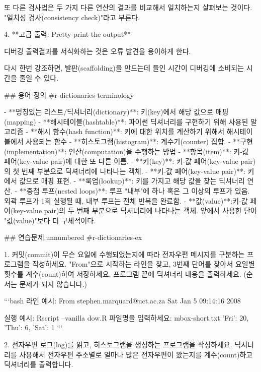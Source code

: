 \documentclass[
  letterpaper,
]{book}
\begin{document}
{    또 다른 검사법은 두 가지 다른 연산의 결과를 비교해서 일치하는지 살펴보는 것이다. "일치성 검사(consistency check)"라고 부른다.

4. **고급 출력: Pretty print the output**

   디버깅 출력결과를 서식화하는 것은 오류 발견을 용이하게 한다.

다시 한번 강조하면, 발판(scaffolding)을 만드는데 들인 시간이 디버깅에 소비되는 시간을 줄일 수 있다.

## 용어 정의 {#r-dictionaries-terminology}

- **명칭있는 리스트/딕셔너리(dictionary)**: 키(key)에서 해당 값으로 매핑(mapping)
- **해시테이블(hashtable)**: 파이썬 딕셔너리를 구현하기 위해 사용된 알고리즘
- **해시 함수(hash function)**: 키에 대한 위치를 계산하기 위해서 해시테이블에서 사용되는 함수
- **히스토그램(histogram)**: 계수기(counter) 집합.
- **구현(implementation)**: 연산(computation)을 수행하는 방법
- **항목(item)**: 키-값 페어(key-value pair)에 대한 또 다른 이름.
- **키(key)**: 키-값 페어(key-value pair)의 첫 번째 부분으로 딕셔너리에 나타나는 객체.
- **키-값 페어(key-value pair)**: 키에서 값으로 매핑 표현.
- **룩업(lookup)**: 키를 가지고 해당 값을 찾는 딕셔너리 연산.
- **중첩 루프(nested loops)**: 루프 "내부"에 하나 혹은 그 이상의 루프가 있음. 외곽 루프가 1회 실행될 때, 내부 루프는 전체 반복을 완료함.
- **값(value)**:키-값 페어(key-value pair)의 두 번째 부분으로 딕셔너리에 나타나는 객체. 앞에서 사용한 단어 "값(value)"보다 더 구체적이다.

## 연습문제{.unnumbered #r-dictionaries-ex}

1. 커밋(commit)이 무슨 요일에 수행되었는지에 따라 전자우편 메시지를 구분하는 프로그램을 작성하세요. 
"From"으로 시작하는 라인을 찾고, 3번째 단어를 찾아서 요일별 횟수를 계수(count)하여 저장하세요. 
프로그램 끝에 딕셔너리 내용을 출력하세요. (순서는 문제가 되지 않습니다.)

```bash
라인 예시:
From stephen.marquard@uct.ac.za Sat Jan  5 09:14:16 2008

실행 예시:
Rscript --vanilla dow.R
파일명을 입력하세요: mbox-short.txt
{'Fri': 20, 'Thu': 6, 'Sat': 1}
```    

2. 전자우편 로그(log)를 읽고, 히스토그램을 생성하는 프로그램을 작성하세요.
딕셔너리를 사용해서 전자우편 주소별로 얼마나 많은 전자우편이 왔는지를 계수(count)하고 딕셔너리를 출력합니다.

}
\end{document}
